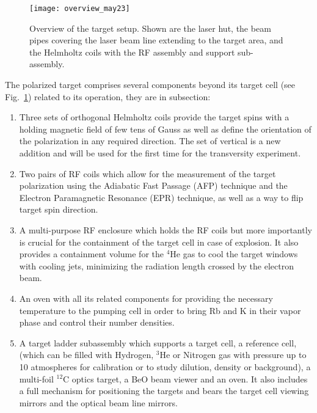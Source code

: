 \begin{figure}[p]
\begin{center}
\centerline{\texttt{[image: overview\_may23]}}
\end{center}
\caption[Overview of the polarized $^3$He target setup]%
{Overview of the target setup. Shown are the laser hut, the
beam pipes covering the laser beam line extending to the target area,
and the Helmholtz coils with the RF assembly and support sub-assembly. }
\label{fig:overview}
\end{figure}

The polarized target comprises several
components beyond its target cell (see Fig.~\ref{fig:overview})
related to its operation, they are in subsection:

\begin{enumerate}

\item 
Three sets of orthogonal Helmholtz coils provide the target spins with a
holding magnetic field 
of few tens of Gauss as well as define the orientation of the
polarization in any required 
direction. The set of vertical is a new addition and will be used for the first
time for the transversity experiment\cite{E06010}.

\item
Two pairs of RF coils which allow for the measurement of the target
polarization
using the Adiabatic Fast Passage (AFP) technique and the Electron
Paramagnetic 
Resonance (EPR) technique, as well as a way to flip target spin direction.

\item
A multi-purpose RF enclosure which holds the RF coils but more
importantly is crucial for the
containment of the target cell in case of explosion. It also provides a
containment volume for the
$^4$He gas to cool the target windows with cooling jets, minimizing the
radiation length crossed  by the electron beam. 

\item 
An oven with all its related components for providing the necessary
temperature to the  pumping cell in order to bring Rb and K
in their vapor phase 
and control their number densities. 

\item 
A target ladder subassembly which supports a target cell,  a reference
cell, (which can be filled with Hydrogen, $^3$He or Nitrogen gas 
with pressure
up to 10 atmospheres for calibration or to study dilution, density or 
background), a multi-foil $^{12}$C optics target, a
BeO beam viewer and an oven. It also includes a full mechanism
for positioning the targets 
and bears the target cell viewing mirrors and the optical beam line
mirrors. 


\end{enumerate}
